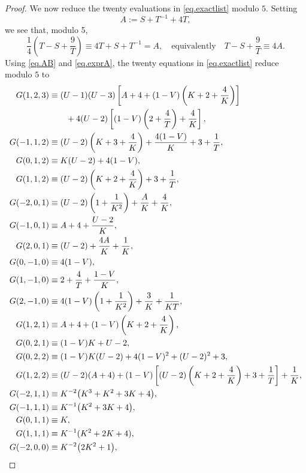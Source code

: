 \documentclass{amsart}
\theoremstyle{definition}
\begin{document}
\begin{proof}
We now reduce the twenty evaluations in \eqref{eq.exactlist} modulo $5$. Setting
\begin{equation}
A:=S+T^{-1}+4T,
\label{eq.AB}
\end{equation} we see that, modulo 5,
\begin{equation}\label{eq.exprA}
	\frac14\left(T-S+\frac9T\right)\equiv4T+S+T^{-1}=A, \quad \text{equivalently}\quad
	T-S+\frac9T\equiv4A.
\end{equation}
Using \eqref{eq.AB} and \eqref{eq.exprA}, the twenty equations in \eqref{eq.exactlist} reduce modulo $5$ to
\begin{align}\label{eq.exactlist_2}
G(1,2,3)&\equiv (U-1)(U-3)\left[A+4+(1-V)\left(K+2+\frac4K\right)\right]\notag\\
&\qquad{}+4(U-2)\left[(1-V)\left(2+\frac4T\right)+\frac4K\right],\notag\\
G(-1,1,2)&\equiv (U-2)\left(K+3+\frac4K\right)+\frac{4(1-V)}{K}+3+\frac1T,\notag\\
G(0,1,2)&\equiv K(U-2)+4(1-V),\notag\\
G(1,1,2)&\equiv (U-2)\left(K+2+\frac4K\right)+3+\frac1T,\notag\\
G(-2,0,1)&\equiv (U-2)\left(1+\frac1{K^{2}}\right)+\frac{A}{K}+\frac4K,\notag\\
G(-1,0,1)&\equiv A+4+\frac{U-2}{K},\notag\\
G(2,0,1)&\equiv (U-2)+\frac{4A}{K}+\frac1K,\notag\\
G(0,-1,0)&\equiv 4(1-V),\notag\\
G(1,-1,0)&\equiv 2+\frac4T+\frac{1-V}{K},\\
G(2,-1,0)&\equiv 4(1-V)\left(1+\frac1{K^{2}}\right)+\frac3K+\frac1{KT},\notag\\
G(1,2,1)&\equiv A+4+(1-V)\left(K+2+\frac4K\right),\notag\\
G(0,2,1)&\equiv (1-V)K+U-2,\notag\\
G(0,2,2)&\equiv (1-V)K(U-2)+4(1-V)^{2}+(U-2)^{2}+3,\notag\\
G(1,2,2)&\equiv (U-2)(A+4)+(1-V)\left[(U-2)\left(K+2+\frac4K\right)+3+\frac1T\right]+\frac1K,\notag
\\
G(-2,1,1)&\equiv K^{-2}\bigl(K^3+K^2+3K+4\bigr),\notag\\
G(-1,1,1)&\equiv K^{-1}\bigl(K^2+3K+4\bigr),\notag\\
G(0,1,1)&\equiv K,\notag\\
G(1,1,1)&\equiv K^{-1}(K^2+2K+4),\notag
\\
G(-2,0,0)&\equiv K^{-2}\bigl(2K^2+1\bigr),\notag\\

\end{align}
\end{proof}
\end{document}
